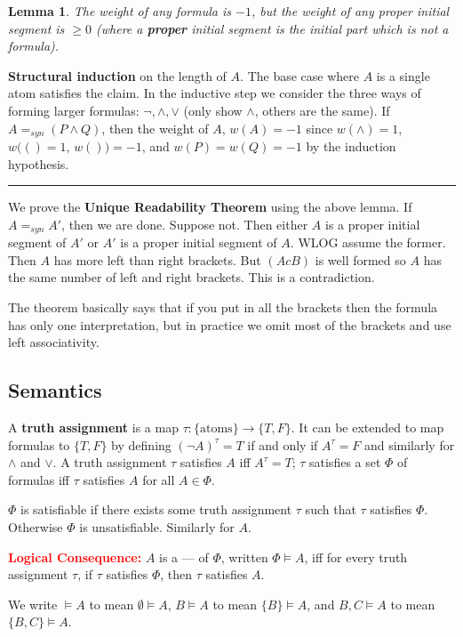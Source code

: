 \documentclass[twoside]{article}
\newtheorem{lemma}[theorem]{Lemma}
\newenvironment{proof}{{\bf Proof:}}{\hfill\rule{2mm}{2mm}}
\begin{document}
\begin{lemma}
The weight of any formula is $-1$, but the weight of any proper initial segment is $\geq 0$ (where a \textbf{proper} initial segment is the initial part which is not a formula). 
\end{lemma}
\begin{proof}
\textbf{Structural induction} on the length of $A$. The base case where $A$ is a single atom satisfies the claim. In the inductive step we consider the three ways of forming larger formulas: $\lnot, \land, \lor$ (only show $\land$, others are the same). If $A =_{syn} (P \land Q)$, then the weight of $A$, $w(A) = -1$ since $w(\land) = 1$, $w(() = 1$, $w()) = -1$, and $w(P) = w(Q) = -1$ by the induction hypothesis.  
\end{proof}

We prove the \textbf{Unique Readability Theorem} using the above lemma. If $A =_{syn} A'$, then we are done. Suppose not. Then either $A$ is a proper initial segment of $A'$ or $A'$ is a proper initial segment of $A$. WLOG assume the former. Then $A$ has more left than right brackets. But $(AcB)$ is well formed so $A$ has the same number of left and right brackets. This is a contradiction.

The theorem basically says that if you put in all the brackets then the formula has only one interpretation, but in practice we omit most of the brackets and use left associativity.
  
\subsection{Semantics}
A \textbf{truth assignment} is a map $\tau: \{\mbox{atoms}\} \rightarrow \{T, F\}$. It can be extended to map formulas to $\{T, F\}$ by defining $(\lnot A)^{\tau} = T$ if and only if $A^{\tau} = F$ and similarly for $\land$ and $\lor$. A truth assignment $\tau$ satisfies $A$ iff $A^{\tau} = T$; $\tau$ satisfies a set $\Phi$ of formulas iff $\tau$ satisfies $A$ for all $A \in \Phi$. 

$\Phi$ is satisfiable if there exists some truth assignment $\tau$ such that $\tau$ satisfies $\Phi$. Otherwise $\Phi$ is unsatisfiable. Similarly for $A$.

\textcolor{red}{\textbf{Logical Consequence:}} $A$ is a --- of $\Phi$, written $\Phi \vDash A$, iff for every truth assignment $\tau$, if $\tau$ satisfies $\Phi$, then $\tau$ satisfies $A$.

We write $\vDash A$ to mean $\emptyset \vDash A$, $B \vDash A$ to mean $\{B\} \vDash A$, and $B, C \vDash A$ to mean $\{B, C\} \vDash A$.
\end{document}
